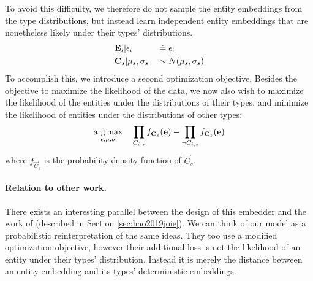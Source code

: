 To avoid this difficulty, we therefore do not sample the entity embeddings from the type distributions, but instead learn independent entity embeddings that are nonetheless likely under their types' distributions.
\begin{align}
    & \vec{E}_i | \epsilon_i && \simpnt \epsilon_i \\
%
    & \vec{C}_{s} | \mu_s, \sigma_s && \sim N(\mu_s, \sigma_s)
\end{align}
To accomplish this, we introduce a second optimization objective. Besides the objective to maximize the likelihood of the data, we now also wish to maximize the likelihood of the entities under the distributions of their types, and minimize the likelihood of entities under the distributions of other types:
\begin{align}
    \operatorname*{arg\,max}_{\epsilon, \mu, \sigma} \quad 
    \prod_{C_{i,s}} f_{\mathbf{C}_{s}} ( \mathbf{e} ) 
  - \prod_{\lnot C_{i,s}} f_{\mathbf{C}_{s}} ( \mathbf{e} )
\end{align}
where $f_{\vec{C}_{s}}$ is the probability density function of $\vec{C}_{s}$.

\paragraph{Relation to other work.}
There exists an interesting parallel between the design of this embedder and the work of \citeauthor{hao2019joie} (described in Section \ref{sec:hao2019joie}).
We can think of our model as a probabilistic reinterpretation of the same ideas.
%
They too use a modified optimization objective, however their additional loss is not the likelihood of an entity under their types' distribution. Instead it is merely the distance between an entity embedding and its types' deterministic embeddings.
%
%

